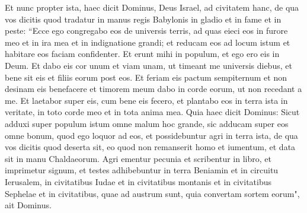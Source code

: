 \begin{biblechapter}
\verse Et nunc propter ista, haec dicit Dominus, Deus Israel, ad civitatem hanc, de qua vos dicitis quod tradatur in manus regis Babylonis in gladio et in fame et in peste: 
\verse “Ecce ego congregabo eos de universis terris, ad quas eieci eos in furore meo et in ira mea et in indignatione grandi; et reducam eos ad locum istum et habitare eos faciam confidenter. 
\verse Et erunt mihi in populum, et ego ero eis in Deum. 
\verse Et dabo eis cor unum et viam unam, ut timeant me universis diebus, et bene sit eis et filiis eorum post eos. 
\verse Et feriam eis pactum sempiternum et non desinam eis benefacere et timorem meum dabo in corde eorum, ut non recedant a me. 
\verse Et laetabor super eis, cum bene eis fecero, et plantabo eos in terra ista in veritate, in toto corde meo et in tota anima mea. 
\verse Quia haec dicit Dominus: Sicut adduxi super populum istum omne malum hoc grande, sic adducam super eos omne bonum, quod ego loquor ad eos, 
\verse et possidebuntur agri in terra ista, de qua vos dicitis quod deserta sit, eo quod non remanserit homo et iumentum, et data sit in manu Chaldaeorum. 
\verse Agri ementur pecunia et scribentur in libro, et imprimetur signum, et testes adhibebuntur in terra Beniamin et in circuitu Ierusalem, in civitatibus Iudae et in civitatibus montanis et in civitatibus Sephelae et in civitatibus, quae ad austrum sunt, quia convertam sortem eorum", ait Dominus. 
\end{biblechapter}

